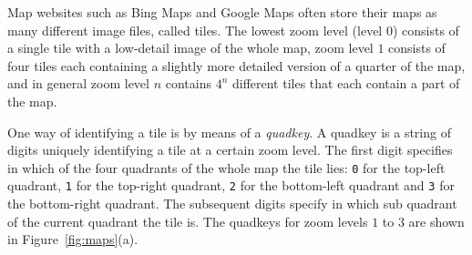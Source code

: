 
Map websites such as Bing Maps and Google Maps often store their maps as many different image files, called tiles. The lowest zoom level (level $0$) consists of a single tile with a low-detail image of the whole map, zoom level $1$ consists of four tiles each containing a slightly more detailed version of a quarter of the map, and in general zoom level $n$ contains $4^n$ different tiles that each contain a part of the map.

One way of identifying a tile is by means of a \emph{quadkey}. A quadkey is a string of digits uniquely identifying a tile at a certain zoom level. The first digit specifies in which of the four  quadrants of the whole map the tile lies: \texttt{0} for the top-left quadrant, \texttt{1} for the top-right quadrant, \texttt{2} for the bottom-left quadrant and \texttt{3} for the bottom-right quadrant. The subsequent digits specify in which sub quadrant of the current quadrant the tile is. The quadkeys for zoom levels $1$ to $3$ are shown in Figure~\ref{fig:maps}(a).

